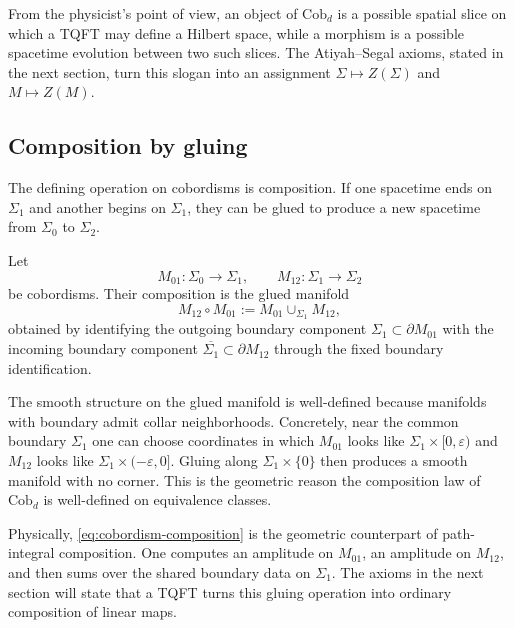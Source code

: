 \medskip

\noindent From the physicist's point of view, an object of $\mathrm{Cob}_d$ is a possible spatial slice on which a TQFT may define a Hilbert space, while a morphism is a possible spacetime evolution between two such slices. The Atiyah--Segal axioms, stated in the next section, turn this slogan into an assignment $\Sigma \mapsto Z(\Sigma)$ and $M \mapsto Z(M)$.

\subsection{Composition by gluing}

The defining operation on cobordisms is composition. If one spacetime ends on $\Sigma_1$ and another begins on $\Sigma_1$, they can be glued to produce a new spacetime from $\Sigma_0$ to $\Sigma_2$.

\begin{definition}\label{def:cobordism-composition}
Let
\begin{equation*}
M_{01} : \Sigma_0 \to \Sigma_1,
\qquad
M_{12} : \Sigma_1 \to \Sigma_2
\end{equation*}
be cobordisms. Their composition is the glued manifold
\begin{equation}\label{eq:cobordism-composition}
M_{12} \circ M_{01} := M_{01} \cup_{\Sigma_1} M_{12},
\end{equation}
obtained by identifying the outgoing boundary component $\Sigma_1 \subset \partial M_{01}$ with the incoming boundary component $\overline{\Sigma_1} \subset \partial M_{12}$ through the fixed boundary identification.
\end{definition}

\begin{remark}\label{rem:collar-neighborhood}
The smooth structure on the glued manifold is well-defined because manifolds with boundary admit collar neighborhoods. Concretely, near the common boundary $\Sigma_1$ one can choose coordinates in which $M_{01}$ looks like $\Sigma_1 \times [0,\varepsilon)$ and $M_{12}$ looks like $\Sigma_1 \times (-\varepsilon,0]$. Gluing along $\Sigma_1 \times \{0\}$ then produces a smooth manifold with no corner. This is the geometric reason the composition law of $\mathrm{Cob}_d$ is well-defined on equivalence classes.
\end{remark}

\noindent Physically, \eqref{eq:cobordism-composition} is the geometric counterpart of path-integral composition. One computes an amplitude on $M_{01}$, an amplitude on $M_{12}$, and then sums over the shared boundary data on $\Sigma_1$. The axioms in the next section will state that a TQFT turns this gluing operation into ordinary composition of linear maps.

